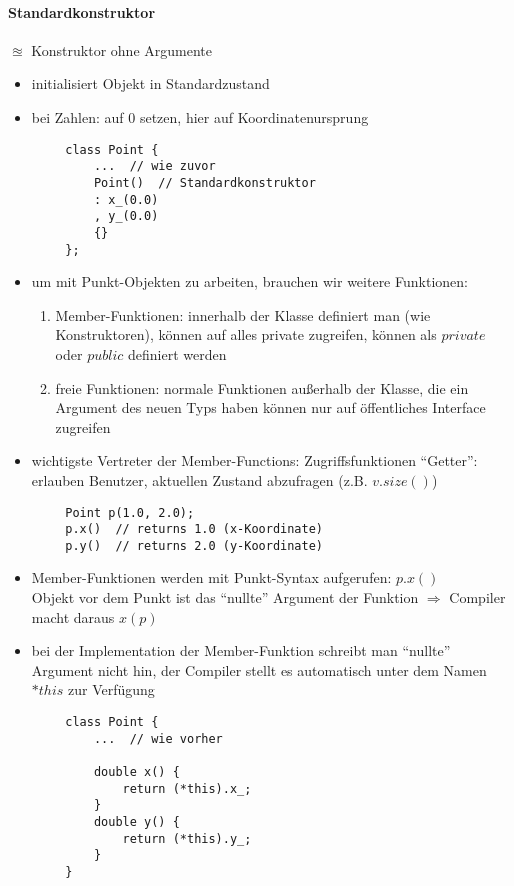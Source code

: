 \documentclass{article}
\begin{document}
\paragraph{Standardkonstruktor}
	 $\approxeq$ Konstruktor ohne Argumente
	 \begin{itemize}
	 	\item initialisiert Objekt in Standardzustand
	 	\item bei Zahlen: auf $0$ setzen, hier auf Koordinatenursprung
	 \end{itemize}
	 \begin{lstlisting}
	 	class Point {
	 		...  // wie zuvor
	 		Point()  // Standardkonstruktor
	 		: x_(0.0)
	 		, y_(0.0)
	 		{}
	 	};
	 \end{lstlisting}
	 \begin{itemize}
	 	\item um mit Punkt-Objekten zu arbeiten, brauchen wir weitere Funktionen:
	 	\begin{enumerate}
	 		\item Member-Funktionen: innerhalb der Klasse definiert man (wie Konstruktoren), können auf alles private zugreifen, können als $private$ oder $public$ definiert werden
	 		\item freie Funktionen: normale Funktionen außerhalb der Klasse, die ein Argument des neuen Typs haben können nur auf öffentliches Interface zugreifen
	 	\end{enumerate}
	 	\item wichtigste Vertreter der Member-Functions: Zugriffsfunktionen ``Getter'': erlauben Benutzer, aktuellen Zustand abzufragen (z.B. $v.size()$)
	 \end{itemize}
	 \begin{lstlisting}
	 	Point p(1.0, 2.0);
	 	p.x()  // returns 1.0 (x-Koordinate)
	 	p.y()  // returns 2.0 (y-Koordinate)
	 \end{lstlisting}
	 \begin{itemize}
	 	\item Member-Funktionen werden mit Punkt-Syntax aufgerufen: $p.x()$ \\
	 	Objekt vor dem Punkt ist das ``nullte'' Argument der Funktion $\Rightarrow $ Compiler macht daraus $x(p)$
	 	\item bei der Implementation der Member-Funktion schreibt man ``nullte'' Argument nicht hin, der Compiler stellt es automatisch unter dem Namen $*this$ zur Verfügung
	 \end{itemize}

	 \begin{lstlisting}
	 	class Point {
	 		...  // wie vorher

	 		double x() {
	 			return (*this).x_;
	 		}
	 		double y() {
	 			return (*this).y_;
	 		}
	 	}
	 \end{lstlisting}
\end{document}
